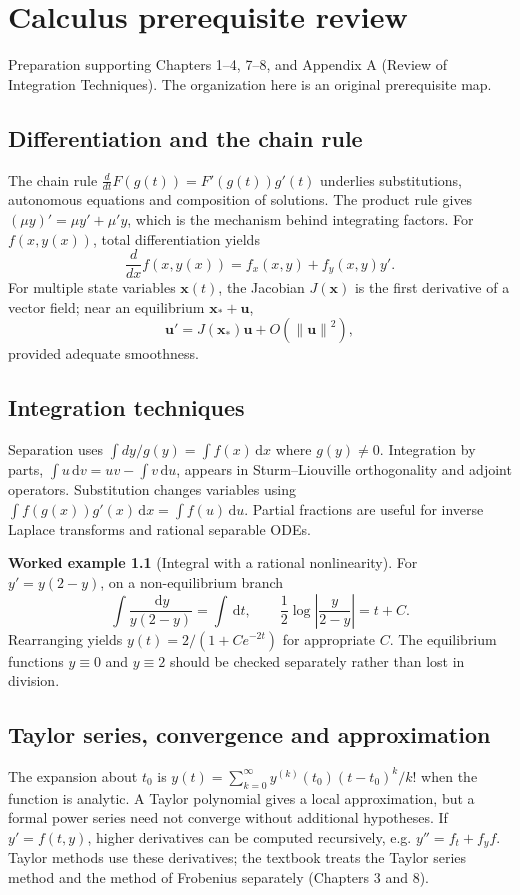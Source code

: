 \documentclass[11pt,letterpaper,oneside]{report}
\theoremstyle{definition}\newtheorem{definition}[theorem]{Definition}
\newtheorem{example}[theorem]{Worked example}
\theoremstyle{remark}\newtheorem{remark}[theorem]{Remark}
\newcommand{\dd}{\,\mathrm{d}}
\newcommand{\norm}[1]{\left\lVert#1\right\rVert}
\newcommand{\abs}[1]{\left\lvert#1\right\rvert}
\begin{document}
\chapter{Calculus prerequisite review}
\begin{bookground}Preparation supporting Chapters 1--4, 7--8, and Appendix A (Review of Integration Techniques). The organization here is an original prerequisite map.\end{bookground}
\section{Differentiation and the chain rule}
The chain rule $\frac{d}{dt}F(g(t))=F'(g(t))g'(t)$ underlies substitutions, autonomous equations and composition of solutions. The product rule gives $(\mu y)'=\mu y'+\mu' y$, which is the mechanism behind integrating factors. For $f(x,y(x))$, total differentiation yields
\[\frac{d}{dx}f(x,y(x))=f_x(x,y)+f_y(x,y)y'.\]
For multiple state variables $\mathbf x(t)$, the Jacobian $J(\mathbf x)$ is the first derivative of a vector field; near an equilibrium $\mathbf x_*+\mathbf u$,
\[\mathbf u'=J(\mathbf x_*)\mathbf u+O(\norm{\mathbf u}^2),\]
provided adequate smoothness.
\section{Integration techniques}
Separation uses $\int\!dy/g(y)=\int\!f(x)\dd x$ where $g(y)\ne0$. Integration by parts, $\int u\dd v=uv-\int v\dd u$, appears in Sturm--Liouville orthogonality and adjoint operators. Substitution changes variables using $\int f(g(x))g'(x)\dd x=\int f(u)\dd u$. Partial fractions are useful for inverse Laplace transforms and rational separable ODEs.
\begin{example}[Integral with a rational nonlinearity]
For $y'=y(2-y)$, on a non-equilibrium branch
\[\int\frac{\dd y}{y(2-y)}=\int\dd t,\qquad\frac12\log\abs{\frac{y}{2-y}}=t+C.\]
Rearranging yields $y(t)=2/(1+Ce^{-2t})$ for appropriate $C$. The equilibrium functions $y\equiv0$ and $y\equiv2$ should be checked separately rather than lost in division.
\end{example}
\section{Taylor series, convergence and approximation}
The expansion about $t_0$ is $y(t)=\sum_{k=0}^\infty y^{(k)}(t_0)(t-t_0)^k/k!$ when the function is analytic. A Taylor polynomial gives a local approximation, but a formal power series need not converge without additional hypotheses. If $y'=f(t,y)$, higher derivatives can be computed recursively, e.g. $y''=f_t+f_y f$. Taylor methods use these derivatives; the textbook treats the Taylor series method and the method of Frobenius separately (Chapters 3 and 8).
\end{document}

